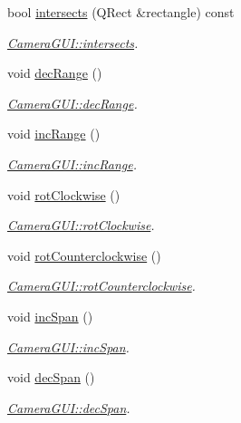 \begin{DoxyCompactItemize}
\item 
bool \hyperlink{classCameraGUI_a9a7be75113cbe6618df95d29a7184ae9}{intersects} (Q\-Rect \&rectangle) const 
\begin{DoxyCompactList}\small\item\em \hyperlink{classCameraGUI_a9a7be75113cbe6618df95d29a7184ae9}{Camera\-G\-U\-I\-::intersects}. \end{DoxyCompactList}\item 
void \hyperlink{classCameraGUI_a899d0ba69e44e61bd8f993e70dd8bf58}{dec\-Range} ()
\begin{DoxyCompactList}\small\item\em \hyperlink{classCameraGUI_a899d0ba69e44e61bd8f993e70dd8bf58}{Camera\-G\-U\-I\-::dec\-Range}. \end{DoxyCompactList}\item 
void \hyperlink{classCameraGUI_ae5a54018d6985ac4fae5f69e49e54a80}{inc\-Range} ()
\begin{DoxyCompactList}\small\item\em \hyperlink{classCameraGUI_ae5a54018d6985ac4fae5f69e49e54a80}{Camera\-G\-U\-I\-::inc\-Range}. \end{DoxyCompactList}\item 
void \hyperlink{classCameraGUI_a9bd87784914772edd3fea9d12b5119c7}{rot\-Clockwise} ()
\begin{DoxyCompactList}\small\item\em \hyperlink{classCameraGUI_a9bd87784914772edd3fea9d12b5119c7}{Camera\-G\-U\-I\-::rot\-Clockwise}. \end{DoxyCompactList}\item 
void \hyperlink{classCameraGUI_a0ba57c92828cd8ee6aa4b1af2b42e4a7}{rot\-Counterclockwise} ()
\begin{DoxyCompactList}\small\item\em \hyperlink{classCameraGUI_a0ba57c92828cd8ee6aa4b1af2b42e4a7}{Camera\-G\-U\-I\-::rot\-Counterclockwise}. \end{DoxyCompactList}\item 
void \hyperlink{classCameraGUI_a525f57d02a5324bb4e55bfa13001bd9e}{inc\-Span} ()
\begin{DoxyCompactList}\small\item\em \hyperlink{classCameraGUI_a525f57d02a5324bb4e55bfa13001bd9e}{Camera\-G\-U\-I\-::inc\-Span}. \end{DoxyCompactList}\item 
void \hyperlink{classCameraGUI_a626ff2fa3927c2292e16187e1ecef422}{dec\-Span} ()
\begin{DoxyCompactList}\small\item\em \hyperlink{classCameraGUI_a626ff2fa3927c2292e16187e1ecef422}{Camera\-G\-U\-I\-::dec\-Span}. \end{DoxyCompactList}\item 

\end{DoxyCompactItemize}
